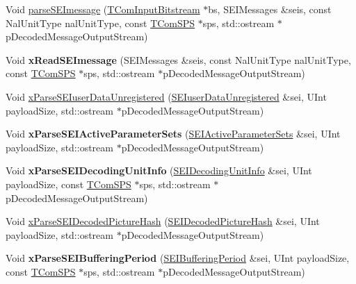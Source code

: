 \begin{DoxyCompactItemize}
\item 
Void \hyperlink{class_s_e_i_reader_aef2fb8032997b770594af56676ee34be}{parse\+S\+E\+Imessage} (\hyperlink{class_t_com_input_bitstream}{T\+Com\+Input\+Bitstream} $\ast$bs, S\+E\+I\+Messages \&seis, const Nal\+Unit\+Type nal\+Unit\+Type, const \hyperlink{class_t_com_s_p_s}{T\+Com\+S\+PS} $\ast$sps, std\+::ostream $\ast$p\+Decoded\+Message\+Output\+Stream)
\item 
\mbox{\label{class_s_e_i_reader_a9e1c1e2d8c2c5432e596a82ad08b7357}} 
Void {\bfseries x\+Read\+S\+E\+Imessage} (S\+E\+I\+Messages \&seis, const Nal\+Unit\+Type nal\+Unit\+Type, const \hyperlink{class_t_com_s_p_s}{T\+Com\+S\+PS} $\ast$sps, std\+::ostream $\ast$p\+Decoded\+Message\+Output\+Stream)
\item 
Void \hyperlink{class_s_e_i_reader_a6bfdf54d8881252e817f5c03bcf73fca}{x\+Parse\+S\+E\+Iuser\+Data\+Unregistered} (\hyperlink{class_s_e_iuser_data_unregistered}{S\+E\+Iuser\+Data\+Unregistered} \&sei, U\+Int payload\+Size, std\+::ostream $\ast$p\+Decoded\+Message\+Output\+Stream)
\item 
\mbox{\label{class_s_e_i_reader_a51fd9e71e0970028c25e393f4ebdef8c}} 
Void {\bfseries x\+Parse\+S\+E\+I\+Active\+Parameter\+Sets} (\hyperlink{class_s_e_i_active_parameter_sets}{S\+E\+I\+Active\+Parameter\+Sets} \&sei, U\+Int payload\+Size, std\+::ostream $\ast$p\+Decoded\+Message\+Output\+Stream)
\item 
\mbox{\label{class_s_e_i_reader_a455089373405fbcdece1c262978be8be}} 
Void {\bfseries x\+Parse\+S\+E\+I\+Decoding\+Unit\+Info} (\hyperlink{class_s_e_i_decoding_unit_info}{S\+E\+I\+Decoding\+Unit\+Info} \&sei, U\+Int payload\+Size, const \hyperlink{class_t_com_s_p_s}{T\+Com\+S\+PS} $\ast$sps, std\+::ostream $\ast$p\+Decoded\+Message\+Output\+Stream)
\item 
Void \hyperlink{class_s_e_i_reader_ac7e9c9932d386e42e60a7b27a9dc42df}{x\+Parse\+S\+E\+I\+Decoded\+Picture\+Hash} (\hyperlink{class_s_e_i_decoded_picture_hash}{S\+E\+I\+Decoded\+Picture\+Hash} \&sei, U\+Int payload\+Size, std\+::ostream $\ast$p\+Decoded\+Message\+Output\+Stream)
\item 
\mbox{\label{class_s_e_i_reader_a391f35c0966cb04406fbb0c0279d8ff4}} 
Void {\bfseries x\+Parse\+S\+E\+I\+Buffering\+Period} (\hyperlink{class_s_e_i_buffering_period}{S\+E\+I\+Buffering\+Period} \&sei, U\+Int payload\+Size, const \hyperlink{class_t_com_s_p_s}{T\+Com\+S\+PS} $\ast$sps, std\+::ostream $\ast$p\+Decoded\+Message\+Output\+Stream)

\end{DoxyCompactItemize}
